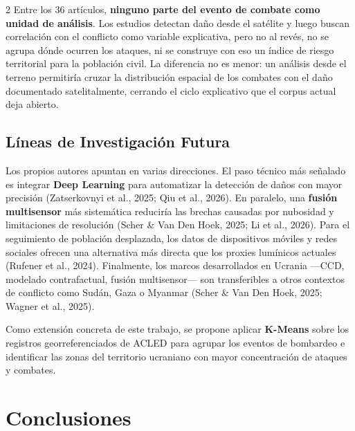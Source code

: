 \documentclass[12pt, a4paper]{article}
\begin{document}
\begin{multicols}{2}
Entre los 36 artículos, \textbf{ninguno parte del evento de combate como unidad de análisis}. Los estudios detectan daño desde el satélite y luego buscan correlación con el conflicto como variable explicativa, pero no al revés, no se agrupa dónde ocurren los ataques, ni se construye con eso un índice de riesgo territorial para la población civil. La diferencia no es menor: un análisis desde el terreno permitiría cruzar la distribución espacial de los combates con el daño documentado satelitalmente, cerrando el ciclo explicativo que el corpus actual deja abierto.

\subsection{Líneas de Investigación Futura}

Los propios autores apuntan en varias direcciones. El paso técnico más señalado es integrar \textbf{Deep Learning} para automatizar la detección de daños con mayor precisión (Zatserkovnyi et al., 2025; Qiu et al., 2026). En paralelo, una \textbf{fusión multisensor} más sistemática reduciría las brechas causadas por nubosidad y limitaciones de resolución (Scher \& Van Den Hoek, 2025; Li et al., 2026). Para el seguimiento de población desplazada, los datos de dispositivos móviles y redes sociales ofrecen una alternativa más directa que los proxies lumínicos actuales (Rufener et al., 2024). Finalmente, los marcos desarrollados en Ucrania —CCD, modelado contrafactual, fusión multisensor— son transferibles a otros contextos de conflicto como Sudán, Gaza o Myanmar (Scher \& Van Den Hoek, 2025; Wagner et al., 2025).

Como extensión concreta de este trabajo, se propone aplicar \textbf{K-Means} sobre los registros georreferenciados de ACLED para agrupar los eventos de bombardeo e identificar las zonas del territorio ucraniano con mayor concentración de ataques y combates.

\end{multicols}

\vspace

\section{Conclusiones}
\end{document}
